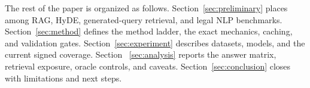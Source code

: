 The rest of the paper is organized as follows. Section~\ref{sec:preliminary}
places \hyre{} among RAG, HyDE, generated-query retrieval, and legal NLP
benchmarks. Section~\ref{sec:method} defines the method ladder, the exact
\hyre{} mechanics, caching, and validation gates. Section~\ref{sec:experiment}
describes datasets, models, and the current signed coverage. Section
~\ref{sec:analysis} reports the answer matrix, retrieval exposure, oracle
controls, and caveats. Section~\ref{sec:conclusion} closes with limitations
and next steps.
